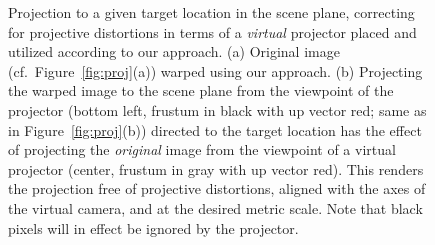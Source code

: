 \documentclass[review]{elsarticle}
\begin{document}
\begin{figure}[t]
    \centering
    \qquad
    \caption{Projection to a given target location in the scene plane, correcting for projective distortions in terms of a \textit{virtual} projector placed and utilized according to our approach. (a) Original image (cf.\ Figure~\ref{fig:proj}(a)) warped using our approach. (b) Projecting the warped image to the scene plane from the viewpoint of the projector (bottom left, frustum in black with up vector red; same as in Figure~\ref{fig:proj}(b)) directed to the target location has the effect of projecting the \textit{original} image from the viewpoint of a virtual projector (center, frustum in gray with up vector red). This renders the projection free of projective distortions, aligned with the axes of the virtual camera, and at the desired metric scale. Note that black pixels will in effect be ignored by the projector.}
    \label{fig:warp}
\end{figure}
\end{document}

